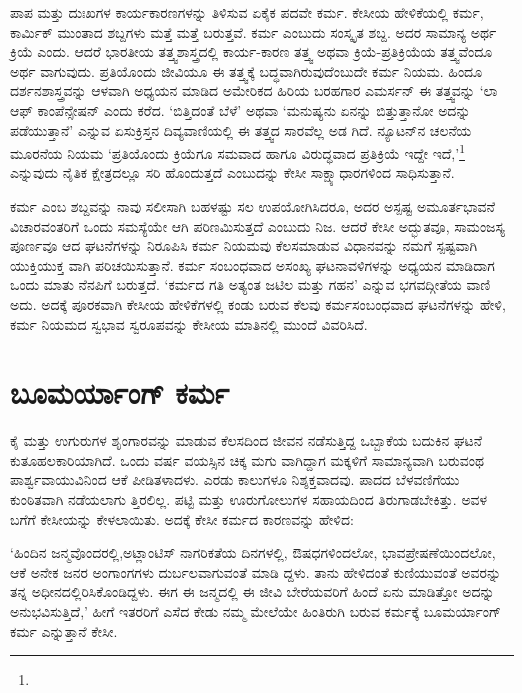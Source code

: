 ಪಾಪ ಮತ್ತು ದುಃಖಗಳ ಕಾರ್ಯಕಾರಣಗಳನ್ನು ತಿಳಿಸುವ ಏಕೈಕ ಪದವೇ ಕರ್ಮ. ಕೇಸೀಯ ಹೇಳಿಕೆಯಲ್ಲಿ ಕರ್ಮ, ಕಾರ್ಮಿಕ್  ಮುಂತಾದ ಶಬ್ದಗಳು ಮತ್ತೆ ಮತ್ತೆ ಬರುತ್ತವೆ. ಕರ್ಮ ಎಂಬುದು ಸಂಸ್ಕೃತ ಶಬ್ದ. ಅದರ ಸಾಮಾನ್ಯ ಅರ್ಥ ಕ್ರಿಯೆ ಎಂದು. ಆದರೆ ಭಾರತೀಯ ತತ್ತ್ವಶಾಸ್ತ್ರದಲ್ಲಿ ಕಾರ್ಯ-ಕಾರಣ ತತ್ತ್ವ ಅಥವಾ ಕ್ರಿಯೆ-ಪ್ರತಿಕ್ರಿಯೆಯ ತತ್ತ್ವವೆಂದೂ ಅರ್ಥ ವಾಗುವುದು. ಪ್ರತಿಯೊಂದು ಜೀವಿಯೂ ಈ ತತ್ತ್ವಕ್ಕೆ ಬದ್ಧವಾಗಿರುವುದೆಂಬುದೇ ಕರ್ಮ ನಿಯಮ. ಹಿಂದೂ ದರ್ಶನಶಾಸ್ತ್ರವನ್ನು ಆಳವಾಗಿ ಅಧ್ಯಯನ ಮಾಡಿದ ಅಮೇರಿಕದ ಹಿರಿಯ ಬರಹಗಾರ ಎಮರ್ಸನ್ ಈ ತತ್ತ್ವವನ್ನು ‘ಲಾ ಆಫ್ ಕಾಂಪೆನ್ಸೇಷನ್​ ಎಂದು ಕರೆದ. ‘ಬಿತ್ತಿದಂತೆ ಬೆಳೆ’ ಅಥವಾ ‘ಮನುಷ್ಯನು ಏನನ್ನು ಬಿತ್ತುತ್ತಾನೋ ಅದನ್ನು ಪಡೆಯುತ್ತಾನೆ’ ಎನ್ನುವ ಏಸುಕ್ರಿಸ್ತನ ದಿವ್ಯವಾಣಿಯಲ್ಲಿ ಈ ತತ್ತ್ವದ ಸಾರವೆಲ್ಲ ಅಡ ಗಿದೆ. ನ್ಯೂಟನ್​ನ ಚಲನೆಯ ಮೂರನೆಯ ನಿಯಮ ‘ಪ್ರತಿಯೊಂದು ಕ್ರಿಯೆಗೂ ಸಮವಾದ ಹಾಗೂ ವಿರುದ್ಧವಾದ ಪ್ರತಿಕ್ರಿಯೆ ಇದ್ದೇ ಇದೆ,’\footnote{} ಎನ್ನುವುದು ನೈತಿಕ ಕ್ಷೇತ್ರದಲ್ಲೂ ಸರಿ ಹೊಂದುತ್ತದೆ ಎಂಬುದನ್ನು ಕೇಸೀ ಸಾಕ್ಷ್ಯಾಧಾರಗಳಿಂದ ಸಾಧಿಸುತ್ತಾನೆ.

ಕರ್ಮ ಎಂಬ ಶಬ್ದವನ್ನು ನಾವು ಸಲೀಸಾಗಿ ಬಹಳಷ್ಟು ಸಲ ಉಪಯೋಗಿಸಿದರೂ, ಅದರ ಅಸ್ಪಷ್ಟ ಅಮೂರ್ತಭಾವನೆ ವಿಚಾರವಂತರಿಗೆ ಒಂದು ಸಮಸ್ಯೆಯೇ ಆಗಿ ಪರಿಣಮಿಸುತ್ತದೆ ಎಂಬುದು ನಿಜ. ಆದರೆ ಕೇಸೀ ಅದ್ಭುತವೂ, ಸಾಮಂಜಸ್ಯ ಪೂರ್ಣವೂ ಆದ ಘಟನೆಗಳನ್ನು ನಿರೂಪಿಸಿ ಕರ್ಮ ನಿಯಮವು ಕೆಲಸಮಾಡುವ ವಿಧಾನವನ್ನು ನಮಗೆ ಸ್ಪಷ್ಟವಾಗಿ ಯುಕ್ತಿಯುಕ್ತ ವಾಗಿ ಪರಿಚಯಿಸುತ್ತಾನೆ. ಕರ್ಮ ಸಂಬಂಧವಾದ ಅಸಂಖ್ಯ ಘಟನಾವಳಿಗಳನ್ನು ಅಧ್ಯಯನ ಮಾಡಿದಾಗ ಒಂದು ಮಾತು ನೆನಪಿಗೆ ಬರುತ್ತದೆ. ‘ಕರ್ಮದ ಗತಿ ಅತ್ಯಂತ ಜಟಿಲ ಮತ್ತು ಗಹನ’ ಎನ್ನುವ ಭಗವದ್ಗೀತೆಯ ವಾಣಿ ಅದು. ಅದಕ್ಕೆ ಪೂರಕವಾಗಿ ಕೇಸೀಯ ಹೇಳಿಕೆಗಳಲ್ಲಿ ಕಂಡು ಬರುವ ಕೆಲವು ಕರ್ಮಸಂಬಂಧವಾದ ಘಟನೆಗಳನ್ನು ಹೇಳಿ, ಕರ್ಮ ನಿಯಮದ ಸ್ವಭಾವ ಸ್ವರೂಪವನ್ನು ಕೇಸೀಯ ಮಾತಿನಲ್ಲಿ ಮುಂದೆ ವಿವರಿಸಿದೆ.


\section{ಬೂಮರ್ಯಾಂಗ್ ಕರ್ಮ}

ಕೈ ಮತ್ತು ಉಗುರುಗಳ ಶೃಂಗಾರವನ್ನು ಮಾಡುವ ಕೆಲಸದಿಂದ ಜೀವನ ನಡೆಸುತ್ತಿದ್ದ ಒಬ್ಬಾಕೆಯ ಬದುಕಿನ ಘಟನೆ ಕುತೂಹಲಕಾರಿಯಾಗಿದೆ. ಒಂದು ವರ್ಷ ವಯಸ್ಸಿನ ಚಿಕ್ಕ ಮಗು ವಾಗಿದ್ದಾಗ ಮಕ್ಕಳಿಗೆ ಸಾಮಾನ್ಯವಾಗಿ ಬರುವಂಥ ಪಾರ್ಶ್ವವಾಯುವಿನಿಂದ ಆಕೆ ಪೀಡಿತಳಾದಳು. ಎರಡು ಕಾಲುಗಳೂ ನಿಶ್ಶಕ್ತವಾದವು. ಪಾದದ ಬೆಳವಣಿಗೆಯು ಕುಂಠಿತವಾಗಿ ನಡೆಯಲಾಗು ತ್ತಿರಲಿಲ್ಲ. ಪಟ್ಟಿ ಮತ್ತು ಊರುಗೋಲುಗಳ ಸಹಾಯದಿಂದ ತಿರುಗಾಡಬೇಕಿತ್ತು. ಅವಳ ಬಗೆಗೆ ಕೇಸೀಯನ್ನು ಕೇಳಲಾಯಿತು. ಅದಕ್ಕೆ ಕೇಸೀ ಕರ್ಮದ ಕಾರಣವನ್ನು ಹೇಳಿದ:

‘ಹಿಂದಿನ ಜನ್ಮವೊಂದರಲ್ಲಿ,ಅಟ್ಲಾಂಟಿಸ್ ನಾಗರಿಕತೆಯ ದಿನಗಳಲ್ಲಿ, ಔಷಧಗಳಿಂದಲೋ, ಭಾವಪ್ರೇಷಣೆಯಿಂದಲೋ, ಆಕೆ ಅನೇಕ ಜನರ ಅಂಗಾಂಗಗಳು ದುರ್ಬಲವಾಗುವಂತೆ ಮಾಡಿ ದ್ದಳು. ತಾನು ಹೇಳಿದಂತೆ ಕುಣಿಯುವಂತೆ ಅವರನ್ನು ತನ್ನ ಅಧೀನದಲ್ಲಿರಿಸಿಕೊಂಡಿದ್ದಳು. ಈಗ ಈ ಜನ್ಮದಲ್ಲಿ ಈ ಜೀವಿ ಬೇರೆಯವರಿಗೆ ಹಿಂದೆ ಏನು ಮಾಡಿತ್ತೋ ಅದನ್ನು ಅನುಭವಿಸುತ್ತಿದೆ,’ ಹೀಗೆ ಇತರರಿಗೆ ಎಸೆದ ಕೇಡು ನಮ್ಮ ಮೇಲೆಯೇ ಹಿಂತಿರುಗಿ ಬರುವ ಕರ್ಮಕ್ಕೆ ಬೂಮರ್ಯಾಂಗ್ ಕರ್ಮ  ಎನ್ನುತ್ತಾನೆ ಕೇಸೀ.

